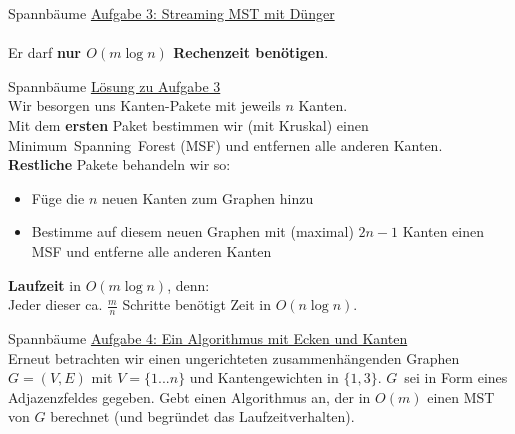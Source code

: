 \begin{frame}{Spannbäume}
	\underline{Aufgabe 3: Streaming MST mit Dünger} \\
	 \\
	Er darf \textbf{nur $O(m \log n)$ Rechenzeit benötigen}.
\end{frame}

\begin{frame}{Spannbäume}
	\underline{Lösung zu Aufgabe 3} \\
	Wir besorgen uns Kanten-Pakete mit jeweils $n$ Kanten. \\
	Mit dem \textbf{ersten} Paket bestimmen wir (mit Kruskal) einen Minimum~Spanning~Forest (MSF) und entfernen alle anderen Kanten. \\
	\textbf{Restliche} Pakete behandeln wir so: \\
	\begin{itemize}
		\item Füge die $n$ neuen Kanten zum Graphen hinzu
		\item Bestimme auf diesem neuen Graphen mit (maximal) $2n-1$ Kanten einen MSF und entferne alle anderen Kanten
	\end{itemize}
	\impl \textbf{Laufzeit} in $O(m \log n)$, denn: \\
	Jeder dieser ca. $\frac{m}{n}$ Schritte benötigt Zeit in $O(n \log n)$.
\end{frame}

\begin{frame}{Spannbäume}
	\underline{Aufgabe 4: Ein Algorithmus mit Ecken und Kanten} \\
	Erneut betrachten wir einen ungerichteten zusammenhängenden Graphen $G = (V, E)$ mit $V = \{1...n\}$ und Kantengewichten in $\{1, 3\}$. $G$~sei in Form eines Adjazenzfeldes gegeben. Gebt einen Algorithmus an, der in $O(m)$ einen MST von $G$ berechnet (und begründet das Laufzeitverhalten).
\end{frame}

